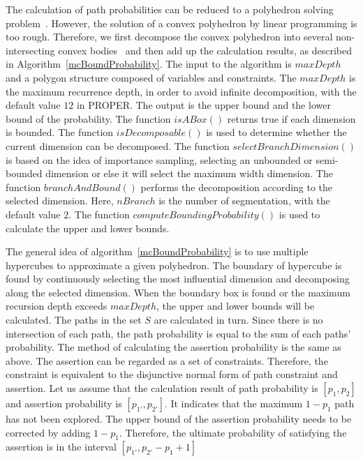 \documentclass[runningheads]{llncs}
\begin{document}
The calculation of path probabilities can be reduced to a polyhedron solving problem~\cite{Visser2012Green}. However, the solution of a convex polyhedron by linear programming is too rough. Therefore, we first decompose the convex polyhedron into several non-intersecting convex bodies~\cite{Bingsheng2020} and then add up the calculation results, as described in Algorithm~\ref{mcBoundProbability}. The input to the algorithm is $maxDepth$ and a polygon structure composed of variables and constraints. The $maxDepth$ is the maximum recurrence depth, in order to avoid infinite decomposition, with the default value $12$ in PROPER. The output is the upper bound and the lower bound of the probability. The function $isABox()$ returns true if each dimension is bounded. The function $isDecomposable()$ is used to determine whether the current dimension can be decomposed. The function $selectBranchDimension()$ is based on the idea of importance sampling, selecting an unbounded or semi-bounded dimension or else it will select the maximum width dimension. The function $branchAndBound()$  performs the decomposition according to the selected dimension. Here, $nBranch$ is the number of segmentation, with the default value $2$. The function $computeBoundingProbability()$ is used to calculate the upper and lower bounds. 

The general idea of algorithm~\ref{mcBoundProbability} is to use multiple hypercubes to approximate a given polyhedron. The boundary of hypercube is found by continuously selecting the most influential dimension and decomposing along the selected dimension. When the boundary box is found or the maximum recursion depth exceeds $maxDepth$, the upper and lower bounds will be calculated.
The paths in the set $S$ are calculated in turn. Since there is no intersection of each path, the path probability is equal to the sum of each paths' probability. The method of calculating the assertion probability is the same as above. The assertion can be regarded as a set of constraints. Therefore, the constraint is equivalent to the disjunctive normal form of path constraint and assertion.
Let us assume that the calculation result of path probability is $[p_1,p_2]$ and assertion probability is $[p_{1'},p_{2'}]$. It indicates that the maximum $1-p_1$ path has not been explored. The upper bound of the assertion probability needs to be corrected by adding $1-p_1$. Therefore, the ultimate probability of satisfying the assertion is in the interval $[p_{1'},p_{2'}-p_1+1]$
\end{document}
